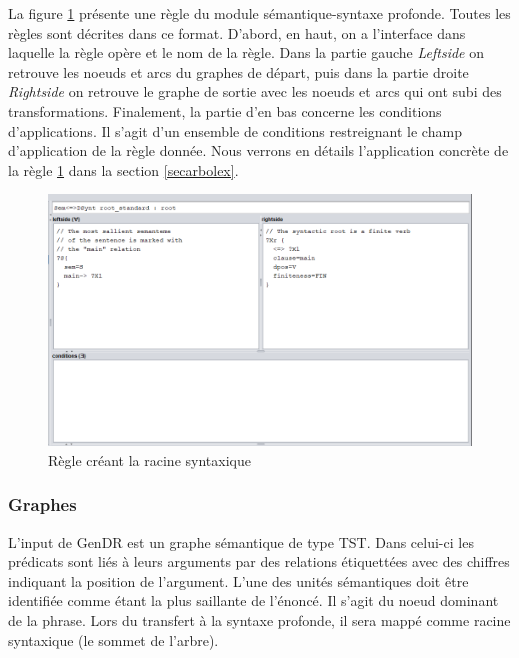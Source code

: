La figure \ref{fig:root} présente une règle du module sémantique-syntaxe profonde. Toutes les règles sont décrites dans ce format. D'abord, en haut, on a l'interface dans laquelle la règle opère et le nom de la règle. Dans la partie gauche \emph{Leftside} on retrouve les noeuds et arcs du graphes de départ, puis dans la partie droite \emph{Rightside} on retrouve le graphe de sortie avec les noeuds et arcs qui ont subi des transformations. Finalement, la partie d'en bas concerne les conditions d'applications. Il s'agit d'un ensemble de conditions restreignant le champ d'application de la règle donnée. Nous verrons en détails l'application concrète de la règle \ref{fig:root} dans la section \ref{secarbolex}.
\begin{figure}[htb]
	\centering
	\includegraphics[width=1\textwidth, trim = {0cm 0cm 0cm 0cm},clip]{ch3/figs/grammaire.png}
	\caption{Règle créant la racine syntaxique}
	\label{fig:root}
\end{figure}


\subsubsection{Graphes}\label{entree-sortie}
L'input de GenDR est un graphe sémantique de type TST. Dans celui-ci les prédicats sont liés à leurs arguments par des relations étiquettées avec des chiffres indiquant la position de l'argument. L'une des unités sémantiques doit être identifiée comme étant la plus saillante de l'énoncé. Il s'agit du noeud dominant de la phrase. Lors du transfert à la syntaxe profonde, il sera mappé comme racine syntaxique (le sommet de l'arbre).

